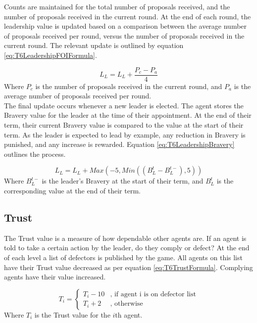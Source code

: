 Counts are maintained for the total number of proposals received, and the number of proposals received in the current round. At the end of each round, the leadership value is updated based on a comparison between the average number of proposals received per round, versus the number of proposals received in the current round. The relevant update is outlined by equation \ref{eq:T6LeadershipFOIFormula}.

\begin{equation}\label{eq:T6LeadershipFOIFormula}
    L_{L} = L_{L} + \frac{P_{c}-P_{a}}{4}
\end{equation}
Where $P_{c}$ is the number of proposals received in the current round, and $P_{a}$ is the average number of proposals received per round.\\

The final update occurs whenever a new leader is elected. The agent stores the Bravery value for the leader at the time of their appointment. At the end of their term, their current Bravery value is compared to the value at the start of their term. As the leader is expected to lead by example, any reduction in Bravery is punished, and any increase is rewarded. Equation \ref{eq:T6LeadershipBravery} outlines the process.

\begin{equation}\label{eq:T6LeadershipBravery}
    L_{L} = L_{L} + Max(-5,Min((B_{L}^{t}-B_{L}^{t-}),5))
\end{equation}
Where $B_{L}^{t-}$ is the leader's Bravery at the start of their term, and $B_{L}^{t}$ is the corresponding value at the end of their term.

\subsection{Trust}

The Trust value is a measure of how dependable other agents are. If an agent is told to take a certain action by the leader, do they comply or defect? At the end of each level a list of defectors is published by the game. All agents on this list have their Trust value decreased as per equation \ref{eq:T6TrustFormula}. Complying agents have their value increased.

\begin{equation}\label{eq:T6TrustFormula}
    T_{i}=\left\{
    	\begin{array}{ll}
    		T_{i}-10 & \mbox{, if agent i is on defector list} \\
    		T_{i}+2  & \mbox{, otherwise} 
    	\end{array}\right.
\end{equation}
Where $T_{i}$ is the Trust value for the $i$th agent.\\

